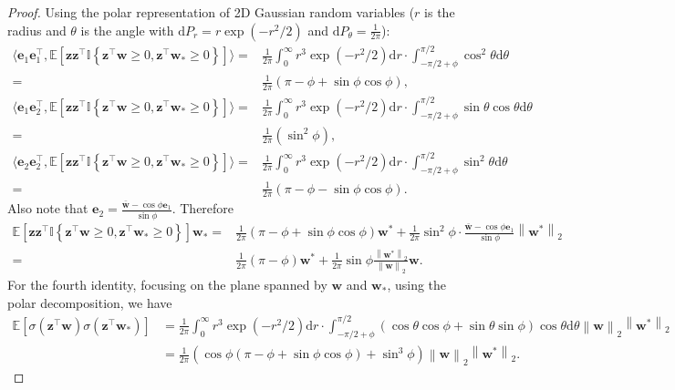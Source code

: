 \documentclass{article}
\newcommand{\vect}[1]{\mathbf{#1}}
\newcommand{\norm}[1]{\left\|#1\right\|}
\newcommand{\expect}{\mathbb{E}}
\newcommand{\diff}{\text{d}}
\newcommand{\indict}{\mathbb{I}}
\newcommand{\relu}[1]{\sigma\left(#1\right)}
\begin{document}
\begin{proof}
Using the polar representation of 2D Gaussian random variables ($r$ is the radius and $\theta$ is the angle with $\diff P_r = r\exp(-r^2/2)$ and $\diff P_\theta = \frac{1}{2\pi}$): \begin{align*}
\langle \vect{e}_1\vect{e}_1^\top, \expect\left[\vect{z}\vect{z}^\top\indict\left\{\vect{z}^\top\vect{w}\ge 0,\vect{z}^\top \vect{w}_*\ge 0\right\}\right] \rangle
= & \frac{1}{2\pi}\int_{0}^{\infty} r^3\exp\left(-r^2/2\right) \diff r \cdot \int_{-\pi/2+\phi}^{\pi/2}\cos^2\theta \diff \theta  \\
= & \frac{1}{2\pi}\left(\pi-\phi +\sin\phi \cos\phi\right),\\
\langle \vect{e}_1\vect{e}_2^\top, \expect\left[\vect{z}\vect{z}^\top\indict\left\{\vect{z}^\top\vect{w}\ge 0,\vect{z}^\top \vect{w}_*\ge 0\right\}\right] \rangle
= & \frac{1}{2\pi}\int_{0}^{\infty} r^3\exp\left(-r^2/2\right) \diff r \cdot \int_{-\pi/2+\phi}^{\pi/2}\sin\theta\cos\theta \diff \theta  \\
= & \frac{1}{2\pi}\left(\sin^2\phi\right),\\
\langle \vect{e}_2\vect{e}_2^\top, \expect\left[\vect{z}\vect{z}^\top\indict\left\{\vect{z}^\top\vect{w}\ge 0,\vect{z}^\top \vect{w}_*\ge 0\right\}\right] \rangle
= & \frac{1}{2\pi}\int_{0}^{\infty} r^3\exp\left(-r^2/2\right) \diff r \cdot \int_{-\pi/2+\phi}^{\pi/2}\sin^2\theta \diff \theta  \\
= & \frac{1}{2\pi}\left(\pi - \phi -\sin\phi \cos\phi\right).
\end{align*}
Also note that $\vect{e}_2 = \frac{\bar{\vect{w}}-\cos \phi\vect{e}_1}{\sin\phi}$.
Therefore \begin{align*}
\expect\left[\vect{z}\vect{z}^\top\indict\left\{\vect{z}^\top\vect{w}\ge 0,\vect{z}^\top \vect{w}_*\ge 0\right\}\right]\vect{w}_* = &\frac{1}{2\pi}\left(\pi-\phi +\sin\phi \cos\phi\right)\vect{w}^* + \frac{1}{2\pi}\sin^2\phi\cdot \frac{\bar{\vect{w}}-\cos\phi\vect{e}_1}{\sin\phi}\norm{\vect{w}^*}_2 \\
= & \frac{1}{2\pi}\left(\pi-\phi\right)\vect{w}^* + \frac{1}{2\pi}\sin\phi\frac{\norm{\vect{w}^*}_2}{\norm{\vect{w}}_2}\vect{w}.
\end{align*}
For the fourth identity, focusing on the plane spanned by $\vect{w}$ and $\vect{w}_*$, using the polar decomposition, we have \begin{align*}
\expect\left[\relu{\vect{z}^\top\vect{w}}\relu{\vect{z}^\top\vect{w}_*}\right] &= \frac{1}{2\pi}\int_{0}^{\infty}r^3\exp\left(-r^2/2\right)\diff r\cdot \int_{-\pi/2+\phi}^{\pi/2} \left(\cos\theta\cos\phi+\sin\theta\sin\phi\right)\cos\theta \diff \theta \norm{\vect{w}}_2\norm{\vect{w}^*}_2\\
& = \frac{1}{2\pi}\left(\cos\phi\left(\pi-\phi+\sin\phi\cos\phi\right)+\sin^3\phi\right)\norm{\vect{w}}_2\norm{\vect{w}^*}_2.
\end{align*}
\end{proof}%
\end{document}
